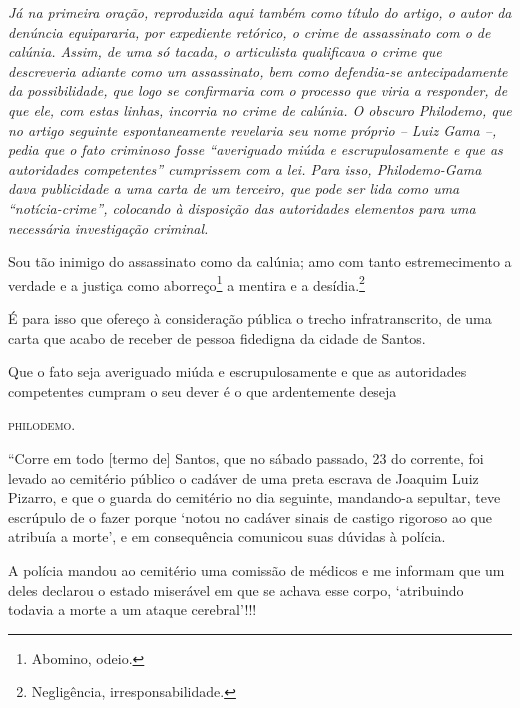 \begin{didascalia}
\emph{Já na primeira oração, reproduzida aqui também como título do
artigo, o autor da denúncia equipararia, por expediente retórico, o
crime de assassinato com o de calúnia. Assim, de uma só tacada, o
articulista qualificava o crime que descreveria adiante como um
assassinato, bem como defendia-se antecipadamente da possibilidade, que
logo se confirmaria com o processo que viria a responder, de que ele,
com estas linhas, incorria no crime de calúnia. O obscuro Philodemo, que
no artigo seguinte espontaneamente revelaria seu nome próprio -- Luiz
Gama --, pedia que o fato criminoso fosse ``averiguado miúda e
escrupulosamente e que as autoridades competentes'' cumprissem com a lei.
Para isso, Philodemo-Gama dava publicidade a uma carta de um terceiro,
que pode ser lida como uma ``notícia-crime'', colocando à disposição das
autoridades elementos para uma necessária investigação criminal.}
\end{didascalia}



Sou tão inimigo do assassinato como da calúnia; amo com tanto
estremecimento a verdade e a justiça como aborreço\footnote{ Abomino,
  odeio.} a mentira e a desídia.\footnote{ Negligência,
  irresponsabilidade.}

É para isso que ofereço à consideração pública o trecho
infratranscrito, de uma carta que acabo de receber de pessoa fidedigna
da cidade de Santos.

Que o fato seja averiguado miúda e escrupulosamente e que as autoridades
competentes cumpram o seu dever é o que ardentemente deseja

\begin{flushright}
\textsc{philodemo}.
\end{flushright}

\asterisc{}

``Corre em todo {[}termo de{]} Santos, que no sábado passado, 23 do
corrente, foi levado ao cemitério público o cadáver de uma preta escrava
de Joaquim Luiz Pizarro, e que o guarda do cemitério no dia seguinte,
mandando-a sepultar, teve escrúpulo de o fazer porque `notou no cadáver
sinais de castigo rigoroso ao que atribuía a morte', e em consequência
comunicou suas dúvidas à polícia.

A polícia mandou ao cemitério uma comissão de médicos e me informam que
um deles declarou o estado miserável em que se achava esse corpo,
`atribuindo todavia a morte a um ataque cerebral'!!!

